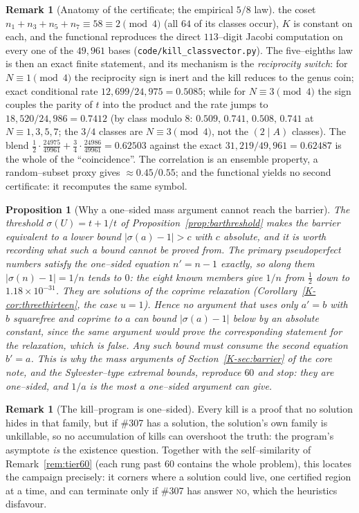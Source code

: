 \documentclass[11pt]{article}
\newtheorem{proposition}[theorem]{Proposition}
\theoremstyle{definition}
\newtheorem{remark}[theorem]{Remark}
\begin{document}
\begin{remark}[Anatomy of the certificate; the empirical $5/8$ law]
the coset $n_1+n_3+n_5+n_7\equiv58\equiv2\pmod4$ (all $64$ of its classes occur), $K$ is constant
on each, and the functional reproduces the direct $113$--digit Jacobi computation on every one of
the $49{,}961$ bases (\texttt{code/kill\_classvector.py}). The five--eighths law is then an exact
finite statement, and its mechanism is the \emph{reciprocity switch}: for $N\equiv1\pmod4$ the
reciprocity sign is inert and the kill reduces to the genus coin; exact conditional rate
$12{,}699/24{,}975=0.5085$; while for $N\equiv3\pmod4$ the sign couples the parity of $t$ into
the product and the rate jumps to $18{,}520/24{,}986=0.7412$ (by class modulo $8$:
$0.509,\,0.741,\,0.508,\,0.741$ at $N\equiv1,3,5,7$; the $3/4$ classes are $N\equiv3\pmod4$, not
the $(2\mid A)$ classes). The blend $\tfrac12\cdot\tfrac{24975}{49961}+\tfrac34\cdot\tfrac{24986}{49961}
=0.62503$ against the exact $31{,}219/49{,}961=0.62487$ is the whole of the ``coincidence''. The
correlation is an ensemble property, a random--subset proxy gives ${\approx}0.45/0.55$; and
the functional yields no second certificate: it recomputes the same symbol.
\end{remark}

\begin{proposition}[Why a one--sided mass argument cannot reach the barrier]\label{prop:twosided}
The threshold $\sigma(U)=t+1/t$ of Proposition~\ref{prop:barthreshold} makes the barrier equivalent to a
lower bound $|\sigma(a)-1|>c$ with $c$ absolute, and it is worth recording what such a bound cannot
be proved from. The primary pseudoperfect numbers satisfy the one--sided equation $n'=n-1$ exactly,
so along them $|\sigma(n)-1|=1/n$ tends to $0$: the eight known members give
$1/n$ from $\tfrac12$ down to $1.18\times10^{-31}$. They are solutions of the coprime relaxation
(Corollary~\ref{K-cor:threethirteen}, the case $u=1$). Hence no argument that uses only $a'=b$ with $b$
squarefree and coprime to $a$ can bound $|\sigma(a)-1|$ below by an absolute constant, since the same
argument would prove the corresponding statement for the relaxation, which is false. Any such bound must
consume the second equation $b'=a$. This is why the mass arguments of Section~\ref{K-sec:barrier} of the core note, and the
Sylvester--type extremal bounds, reproduce $60$ and stop: they are one--sided, and $1/a$ is the most a
one--sided argument can give.
\end{proposition}

\begin{remark}[The kill--program is one--sided]\label{rem:oneside}
Every kill is a proof that no solution hides in that family, but if \#307 has a solution, the
solution's own family is unkillable, so no accumulation of kills can overshoot the truth: the
program's asymptote \emph{is} the existence question. Together with the self--similarity of
Remark~\ref{rem:tier60} (each rung past $60$ contains the whole problem), this locates the
campaign precisely: it corners where a solution could live, one certified region at a time, and
can terminate only if \#307 has answer \textsc{no}, which the heuristics disfavour.
\end{remark}
\end{document}
